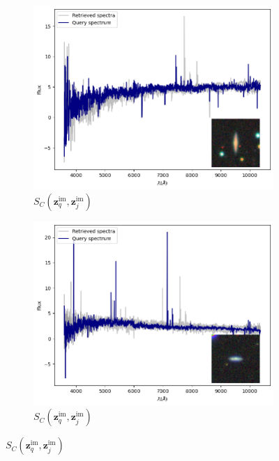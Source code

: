 \documentclass[a4paper,12pt]{article}
\begin{document}
\begin{figure}[H]
    \centering
    \vspace*{-1.3cm}

    \begin{subfigure}[b]{0.45\textwidth}
        \centering
        \includegraphics[width=\textwidth]{../figures/spectral_retrieval_im_im_1}
        \caption{$S_C(\mathbf{z}_q^{\text{im}}, \mathbf{z}_j^{\text{im}})$}
        \label{fig:im_im_1}
    \end{subfigure}%
    \hfill
    \begin{subfigure}[b]{0.45\textwidth}
        \centering
        \includegraphics[width=\textwidth]{../figures/spectral_retrieval_im_im_2}
        \caption{$S_C(\mathbf{z}_q^{\text{im}}, \mathbf{z}_j^{\text{im}})$}
        \label{fig:im_im_2}
    \end{subfigure}


\end{figure}
\end{document}
